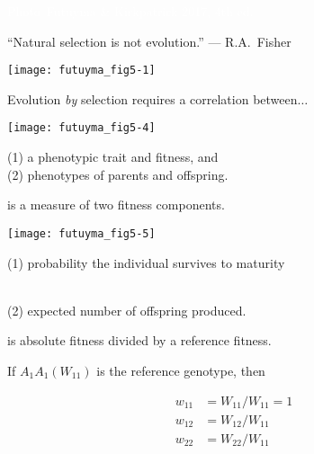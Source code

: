\documentclass[t]{beamer}
\begin{document}


{
\begin{frame}[b]

	\tiny\hfill \textcolor{white}{Photo \textcopyright\,Futuyma \& Kirkpatrick 2017, 4th ed.}
\end{frame}
}
%

\begin{frame}[t,plain]{“Natural selection is not evolution.” --- R.A.~Fisher}

\texttt{[image: futuyma\_fig5-1]}


\end{frame}

\begin{frame}[t,plain]{Evolution \emph{by} selection requires a correlation between$\dots$ }

\texttt{[image: futuyma\_fig5-4]}

\hangpara (1) a phenotypic trait and fitness, and\\
 (2) phenotypes of parents and offspring.
 
 \vfilll
 

\end{frame}


%
\begin{frame}[t]{  is a measure of two fitness components.}
\begin{multicols}{2}
\texttt{[image: futuyma\_fig5-5]}

\columnbreak

(1) probability the  individual survives to maturity

\quad {\Large $\times$}\\

(2) expected number of offspring produced.
\end{multicols}

\vfilll


\end{frame}

\begin{frame}[t]{ is absolute fitness divided by a reference fitness.}

\hangpara If $A_1A_1 \left(W_{11}\right)$ is the reference genotype, then

\begin{align*}
w_{11} &= W_{11}/W_{11} = 1\\
w_{12} &= W_{12}/W_{11}\\
w_{22} &= W_{22}/W_{11}
\end{align*}

\end{frame}
\end{document}
